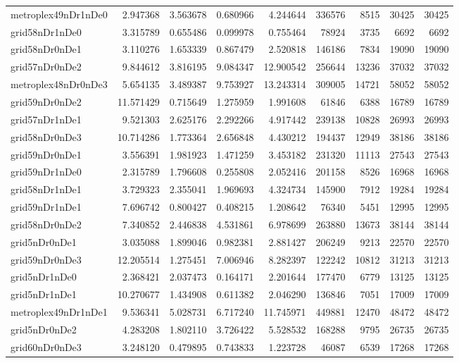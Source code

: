 \begin{longtable}{|l|r|r|r|r|r|r|r|r|}
metroplex49nDr1nDe0 & 2.947368 & 3.563678 & 0.680966 & 4.244644 & 336576 & 8515 & 30425 & 30425 \\
grid58nDr1nDe0 & 3.315789 & 0.655486 & 0.099978 & 0.755464 & 78924 & 3735 & 6692 & 6692 \\
grid58nDr0nDe1 & 3.110276 & 1.653339 & 0.867479 & 2.520818 & 146186 & 7834 & 19090 & 19090 \\
grid57nDr0nDe2 & 9.844612 & 3.816195 & 9.084347 & 12.900542 & 256644 & 13236 & 37032 & 37032 \\
metroplex48nDr0nDe3 & 5.654135 & 3.489387 & 9.753927 & 13.243314 & 309005 & 14721 & 58052 & 58052 \\
grid59nDr0nDe2 & 11.571429 & 0.715649 & 1.275959 & 1.991608 & 61846 & 6388 & 16789 & 16789 \\
grid57nDr1nDe1 & 9.521303 & 2.625176 & 2.292266 & 4.917442 & 239138 & 10828 & 26993 & 26993 \\
grid58nDr0nDe3 & 10.714286 & 1.773364 & 2.656848 & 4.430212 & 194437 & 12949 & 38186 & 38186 \\
grid59nDr0nDe1 & 3.556391 & 1.981923 & 1.471259 & 3.453182 & 231320 & 11113 & 27543 & 27543 \\
grid59nDr1nDe0 & 2.315789 & 1.796608 & 0.255808 & 2.052416 & 201158 & 8526 & 16968 & 16968 \\
grid58nDr1nDe1 & 3.729323 & 2.355041 & 1.969693 & 4.324734 & 145900 & 7912 & 19284 & 19284 \\
grid59nDr1nDe1 & 7.696742 & 0.800427 & 0.408215 & 1.208642 & 76340 & 5451 & 12995 & 12995 \\
grid58nDr0nDe2 & 7.340852 & 2.446838 & 4.531861 & 6.978699 & 263880 & 13673 & 38144 & 38144 \\
grid5nDr0nDe1 & 3.035088 & 1.899046 & 0.982381 & 2.881427 & 206249 & 9213 & 22570 & 22570 \\
grid59nDr0nDe3 & 12.205514 & 1.275451 & 7.006946 & 8.282397 & 122242 & 10812 & 31213 & 31213 \\
grid5nDr1nDe0 & 2.368421 & 2.037473 & 0.164171 & 2.201644 & 177470 & 6779 & 13125 & 13125 \\
grid5nDr1nDe1 & 10.270677 & 1.434908 & 0.611382 & 2.046290 & 136846 & 7051 & 17009 & 17009 \\
metroplex49nDr1nDe1 & 9.536341 & 5.028731 & 6.717240 & 11.745971 & 449881 & 12470 & 48472 & 48472 \\
grid5nDr0nDe2 & 4.283208 & 1.802110 & 3.726422 & 5.528532 & 168288 & 9795 & 26735 & 26735 \\
grid60nDr0nDe3 & 3.248120 & 0.479895 & 0.743833 & 1.223728 & 46087 & 6539 & 17268 & 17268 \\

\end{longtable}

